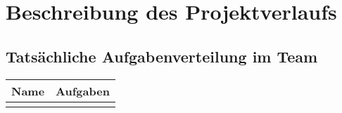 \section{Beschreibung des Projektverlaufs}

\subsection{Tatsächliche Aufgabenverteilung im Team}


{\def\arraystretch{1.25}\tabcolsep=5pt
	\begin{longtable}{|l|p{26em}|}
		\hline
		\textbf{Name} & \textbf{Aufgaben}
		\\ \hline \hline
		\endfirsthead
		
		\hline
		\endhead
		
		\hline
		\endfoot
		

\end{longtable}}

